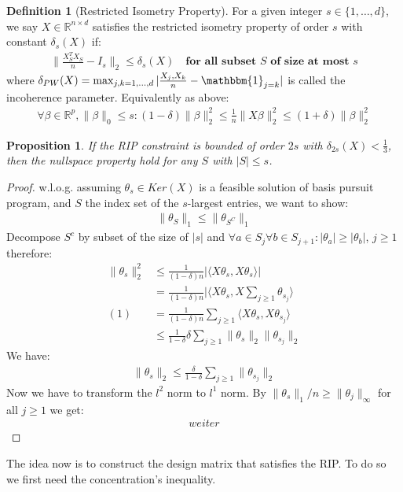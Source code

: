 \documentclass[a4paper,12pt, oneside, fleqn]{book}
\newtheorem{proposition}[theorem]{Proposition}
\theoremstyle{definition}
\newtheorem{definition}{Definition}[section]
\theoremstyle{remark}
\begin{document}
\begin{definition}[Restricted Isometry Property]
	For a given integer $s \in \{1, \dots, d\}$, we say $X \in \mathbb{R}^{n \times d}$ satisfies the restricted isometry property of order $s$ with constant $\delta_s(X)$ if:
	\begin{align*}
		\|\frac{X_S^T X_S}{n} - I_s\|_2 \leq \delta_s(X) \quad \textbf{for all subset $S$ of size at most $s$}
	\end{align*}
	where $\delta_{PW}(X) = \max_{j, k = 1, \dots, d} |\frac{X_j, X_k}{n} - \mathbbm{1}_{j = k}|$ is called the incoherence parameter. Equivalently as above:
	\begin{align*}
		\forall \beta \in \mathbb{R}^p, \|\beta\|_0 \leq s:(1-\delta)\|\beta\|^2_2 \leq \frac{1}{n} \|X\beta\|^2_2 \leq (1+\delta)\| \beta\|^2_2
	\end{align*}
\end{definition}

\begin{proposition}
	If the RIP constraint is bounded of order $2s$ with $\delta_{2s}(X) < \frac{1}{3}$, then the nullspace property hold for any $S$ with $|S| \leq s$.
\end{proposition}
\begin{proof}
	w.l.o.g. assuming $\theta_s\in Ker(X)$ is a feasible solution of basis pursuit program, and $S$ the index set of the $s$-largest entries, we want to show:
	\begin{align*}
		\|\theta_{S}\|_1 \leq  \|\theta_{S^C}\|_1 
	\end{align*} 
	Decompose $S^c$ by subset of the size of $|s|$ and $\forall a \in S_j \forall b \in S_{j+1}: |\theta_a| \geq |\theta_b|$, $j \geq 1$ therefore:
	\begin{align*}
		\|\theta_s\|_2 ^2 &\leq \frac{1}{(1-\delta)n} |\langle X\theta_s, X\theta_s\rangle|\\
		&= \frac{1}{(1-\delta)n} |\langle X \theta_s , X \sum_{j \geq 1} \theta_{s_j} \rangle\\
	(1)	&=  \frac{1}{(1-\delta)n} \sum_{j \geq1} \langle X \theta_s, X \theta_{s_j}\rangle\\
		&\leq \frac{1}{1 - \delta} \delta \sum_{j \geq 1} \|\theta_s\|_2 \| \theta_{s_j}\|_2 
	\end{align*}
	We have:
	\begin{align*}
		\|\theta_s\|_2 \leq \frac{\delta}{1 - \delta}\sum_{j \geq 1} \|\theta_{s_j}\|_2
	\end{align*}
	Now we have to transform the $l^2$ norm to $l^1$ norm. By $\|\theta_s\|_1 \slash n \geq \|\theta_j\|_\infty$ for all $j \geq 1$ we get:
	\begin{align*}
		weiter
	\end{align*}
\end{proof}
The idea now is to construct the design matrix that satisfies the RIP. To do so we first need the concentration's inequality.
\end{document}
